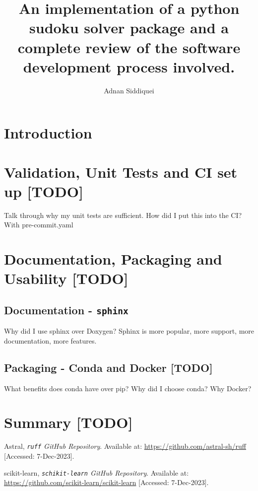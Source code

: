 \documentclass[a4paper,11pt]{article}
\title{\boldmath An implementation of a python sudoku solver package and a complete review of the software development
process involved.}
\author{Adnan Siddiquei}
\affiliation{University of Cambridge}
\newcommand{\inlinecode}[1]{\lstinline{#1}}
\begin{document}
\maketitle
\flushbottom

\section{Introduction}\label{sec:intro}






\section{Validation, Unit Tests and CI set up [TODO]}\label{sec:validation-unit-tests-and-ci-set-up}
Talk through why my unit tests are sufficient.
How did I put this into the CI? With pre-commit.yaml


\section{Documentation, Packaging and Usability [TODO]}\label{sec:documentation-packaging-and-usability}
\subsection{Documentation - \inlinecode{sphinx}}\label{subsec:documentation-sphinx}
Why did I use sphinx over Doxygen? Sphinx is more popular, more support, more documentation, more features.

\subsection{Packaging - Conda and Docker [TODO]}\label{subsec:packaging-pypi}
What benefits does conda have over pip? Why did I choose conda?
Why Docker?

\section{Summary [TODO]}
\label{sec:conclusion}


\begin{thebibliography}{99}

Astral,
\textit{\inlinecode{ruff} GitHub Repository}.
Available at: \url{https://github.com/astral-sh/ruff}
[Accessed: 7-Dec-2023].

scikit-learn,
\textit{\inlinecode{schikit-learn} GitHub Repository}.
Available at: \url{https://github.com/scikit-learn/scikit-learn}
[Accessed: 7-Dec-2023].

\end{thebibliography}
\end{document}
